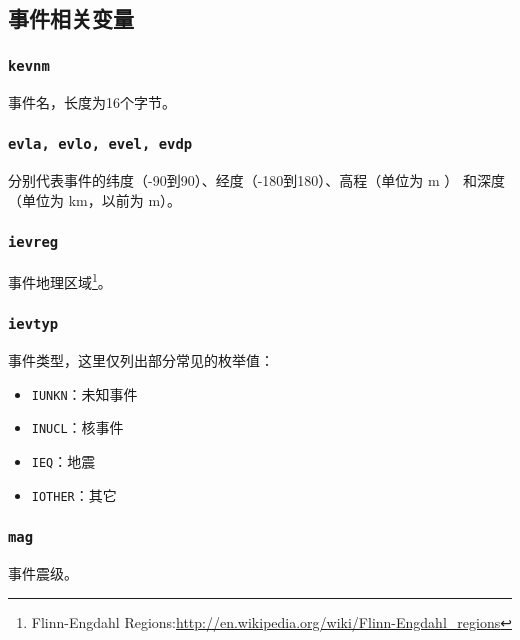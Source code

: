 \subsection{事件相关变量}
\subsubsection{\texttt{kevnm}}
事件名，长度为16个字节。

\subsubsection{\texttt{evla, evlo, evel\dag, evdp}}
分别代表事件的纬度（-90到90）、经度（-180到180）、高程（单位为 \si{\m} ）
和深度（单位为 \si{\km}，以前为 \si{\m}）。

\subsubsection{\texttt{ievreg}\dag}
事件地理区域\footnote{Flinn-Engdahl Regions:\url{http://en.wikipedia.org/wiki/Flinn-Engdahl_regions}}。

\subsubsection{\texttt{ievtyp}}
事件类型，这里仅列出部分常见的枚举值：
\begin{itemize}
\item \texttt{IUNKN}：未知事件
\item \texttt{INUCL}：核事件
\item \texttt{IEQ}：地震
\item \texttt{IOTHER}：其它
\end{itemize}

\subsubsection{\texttt{mag}}
事件震级。

